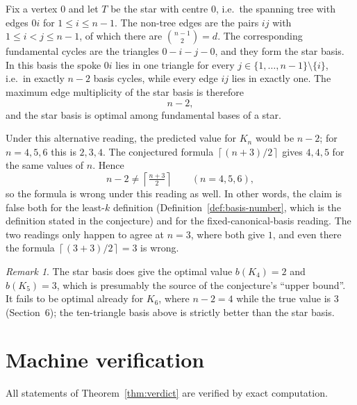 \documentclass[11pt]{article}
\theoremstyle{definition}
\theoremstyle{remark}
\newtheorem{remark}[theorem]{Remark}
\newcommand{\ceil}[1]{\left\lceil #1 \right\rceil}
\begin{document}
Fix a vertex $0$ and let $T$ be the star with centre $0$, i.e.\ the spanning
tree with edges $0i$ for $1\le i\le n-1$. The non-tree edges are the pairs
$ij$ with $1\le i<j\le n-1$, of which there are
$\binom{n-1}{2}=d$. The corresponding fundamental cycles are the triangles
$0\!-\!i\!-\!j\!-\!0$, and they form the star basis. In this basis the spoke
$0i$ lies in one triangle for every $j\in\{1,\dots,n-1\}\setminus\{i\}$, i.e.\
in exactly $n-2$ basis cycles, while every edge $ij$ lies in exactly one. The
maximum edge multiplicity of the star basis is therefore
\begin{equation}\label{eq:star}
  n-2,
\end{equation}
and the star basis is optimal among fundamental bases of a star.

Under this alternative reading, the predicted value for $K_n$ would be
$n-2$; for $n=4,5,6$ this is $2,3,4$. The conjectured formula
$\ceil{(n+3)/2}$ gives $4,4,5$ for the same values of $n$. Hence
\begin{equation}\label{eq:star-mismatch}
  n-2 \neq \ceil{\tfrac{n+3}{2}} \qquad (n=4,5,6),
\end{equation}
so the formula is wrong under this reading as well. In other words, the claim
is false both for the least-$k$ definition (Definition~\ref{def:basis-number},
which is the definition stated in the conjecture) and for the fixed-canonical-basis
reading. The two readings only happen to agree at $n=3$, where both give $1$,
and even there the formula $\ceil{(3+3)/2}=3$ is wrong.

\begin{remark}
The star basis does give the optimal value $b(K_4)=2$ and $b(K_5)=3$, which is
presumably the source of the conjecture's ``upper bound''. It fails to be
optimal already for $K_6$, where $n-2=4$ while the true value is $3$
(Section~6); the ten-triangle basis above is strictly better than the star
basis.
\end{remark}

\section{Machine verification}

All statements of Theorem~\ref{thm:verdict} are verified by exact computation.
\end{document}
